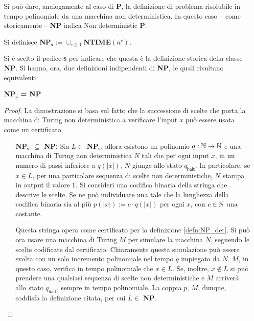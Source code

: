 Si può dare, analogamente al caso di \textbf{P}, la definizione di problema risolubile in tempo polinomiale da una macchina non deterministica.
In questo caso -- come storicamente -- \textbf{NP} indica Non deterministic \textbf{P}.
\begin{defn}\label{defn:NP_Ndet}
 Si definisce \textbf{NP$_\mathbf{s}$}$:= \cup_{c\geq 1}$\textbf{NTIME}$(n^c)$.
\end{defn}
Si è scelto il pedice \textbf{s} per indicare che questa è la definizione storica della classe \textbf{NP}.
Si hanno, ora, due definizioni indipendenti di \textbf{NP}, le quali risultano equivalenti:
\begin{thm}
 \textbf{NP$_\mathbf{s}$ = NP}
\end{thm}
\begin{proof}
 La dimostrazione si basa sul fatto che la successione di scelte che porta la macchina di Turing non deterministica a verificare l'input $x$ può essere usata come un certificato.
 \begin{enumerate}[align=left]
  \item[\textbf{NP$_\mathbf{s}$ $\subseteq$ NP:}] Sia $L \in$ \textbf{NP$_\mathbf{s}$}, allora esistono un polinomio $q: \mathbb{N} \to \mathbb{N}$ e una macchina di Turing non deterministica $N$ tali che per ogni input $x$, in un numero di passi inferiore a $q(|x|)$, $N$ giunge allo stato $q_{\mathsf{halt}}$.
  In particolare, se $x \in L$, per una particolare sequenza di scelte non deterministiche, $N$ stampa in output il valore $1$.
  Si consideri una codifica binaria della stringa che descrive le scelte.
  Se ne può individuare una tale che la lunghezza della codifica binaria sia al più $p(|x|) := c \cdot q(|x|)$ per ogni $x$, con $c \in \mathbb{N}$ una costante.
  
  Questa stringa opera come certificato per la definizione \ref{defn:NP_det}.
  Si può ora usare una macchina di Turing $M$ per simulare la macchina $N$, seguendo le scelte codificate dal certificato.
  Chiaramente questa simulazione può essere svolta con un solo incremento polinomiale nel tempo $q$ impiegato da $N$.
  $M$, in questo caso, verifica in tempo polinomiale che $x \in L$.
  Se, inoltre, $x \notin L$ si può prendere una qualsiasi sequenza di scelte non deterministiche e $M$ arriverà allo stato $q_{\mathsf{halt}}$, sempre in tempo polinomiale.
  La coppia $p$, $M$, dunque, soddisfa la definizione citata, per cui $L \in$ \textbf{NP}.
  

\end{enumerate}
\end{proof}
